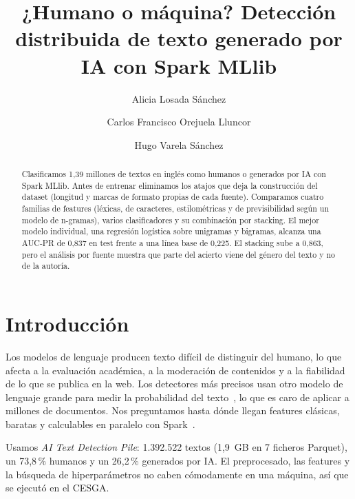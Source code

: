 \documentclass[runningheads]{llncs}
\begin{document}
\title{¿Humano o máquina? Detección distribuida de texto generado por IA con Spark MLlib}

\author{Alicia Losada Sánchez \and Carlos Francisco Orejuela Lluncor \and Hugo Varela Sánchez}

\maketitle

\begin{abstract}
Clasificamos 1,39 millones de textos en inglés como humanos o generados por IA con Spark
MLlib. Antes de entrenar eliminamos los atajos que deja
la construcción del dataset (longitud y marcas de formato propias de cada fuente). Comparamos
cuatro familias de features (léxicas, de caracteres, estilométricas y de previsibilidad según
un modelo de n-gramas), varios clasificadores y su combinación por stacking. El mejor modelo
individual, una regresión logística sobre unigramas y bigramas, alcanza una AUC-PR de 0,837 en
test frente a una línea base de 0,225. El stacking sube a 0,863, pero el análisis por fuente muestra
que parte del acierto viene del género del texto y no de la autoría.

\end{abstract}

\section{Introducción}

Los modelos de lenguaje producen texto difícil de distinguir del humano, lo que afecta a la
evaluación académica, a la moderación de contenidos y a la fiabilidad de lo que se publica en
la web. Los detectores más precisos usan otro modelo de lenguaje grande para medir la
probabilidad del texto~\cite{gehrmann2019gltr,mitchell2023detectgpt}, lo que es caro de aplicar
a millones de documentos. Nos preguntamos hasta dónde llegan features clásicas, baratas y
calculables en paralelo con Spark~\cite{zaharia2016spark,meng2016mllib}.

Usamos \emph{AI Text Detection Pile}: 1.392.522 textos (1,9~GB en 7 ficheros
Parquet), un 73,8\,\% humanos y un 26,2\,\% generados por IA. El preprocesado, las features y la búsqueda
de hiperparámetros no caben cómodamente en una máquina, así que se ejecutó en el CESGA.
\end{document}
